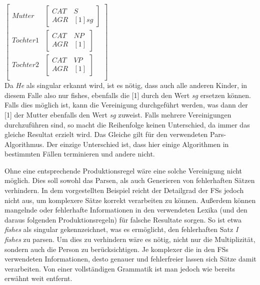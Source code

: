 \documentclass[12pt]{report}
\begin{document}
$\begin{bmatrix} 
Mutter & \begin{bmatrix} 
CAT & S \\
AGR & [1] sg
\end{bmatrix} \\
Tochter 1 & \begin{bmatrix} 
CAT & NP \\
AGR & [1]
\end{bmatrix} \\
Tochter 2 & \begin{bmatrix} 
CAT & VP \\
AGR & [1]
\end{bmatrix}\\
\end{bmatrix}$\\

Da \textit{\glqq  He\grqq{}} als singular erkannt wird, ist es nötig, dass auch alle anderen Kinder, in diesem Falle also nur \glqq  fishes\grqq{}, ebenfalls die [1] durch den Wert \textit{sg} ersetzen können. Falls dies möglich ist, kann die Vereinigung durchgeführt werden, was dann der [1] der Mutter ebenfalls den Wert \textit{sg} zuweist. Falls mehrere Vereinigungen durchzuführen sind, so macht die Reihenfolge keinen Unterschied, da immer das gleiche Resultat erzielt wird. Das Gleiche gilt für den verwendeten Pars-Algorithmus. Der einzige Unterschied ist, dass hier einige Algorithmen in bestimmten Fällen terminieren und andere nicht. 

Ohne eine entsprechende Produktionsregel wäre eine solche Vereinigung nicht möglich. Dies soll sowohl das Parsen, als auch Generieren von fehlerhaften Sätzen verhindern. In dem vorgestellten Beispiel reicht der Detailgrad der FSs jedoch nicht aus, um komplexere Sätze korrekt verarbeiten zu können.
Außerdem können mangelnde oder fehlerhafte Informationen in den verwendeten Lexika (und den daraus folgenden Produktionsregeln) für falsche Resultate sorgen. So ist etwa \textit{\glqq  fishes\grqq{}} als singular gekennzeichnet, was es ermöglicht, den fehlerhaften Satz \textit{\glqq  I fishes\grqq{}} zu parsen. Um dies zu verhindern wäre es nötig, nicht nur die Multiplizität, sondern auch die Person zu berücksichtigen. Je komplexer die in den FSs verwendeten Informationen, desto genauer und fehlerfreier lassen sich Sätze damit verarbeiten. Von einer vollständigen Grammatik ist man jedoch wie bereits erwähnt weit entfernt. 
\end{document}
